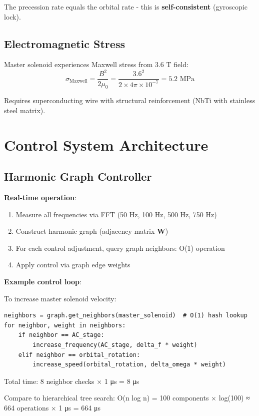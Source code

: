 \documentclass[12pt,a4paper]{article}
\begin{document}
The precession rate equals the orbital rate - this is \textbf{self-consistent} (gyroscopic lock).

\subsection{Electromagnetic Stress}

Master solenoid experiences Maxwell stress from 3.6 T field:
\begin{equation}
\sigma_{\text{Maxwell}} = \frac{B^2}{2\mu_0} = \frac{3.6^2}{2 \times 4\pi \times 10^{-7}} = 5.2 \text{ MPa}
\end{equation}

Requires superconducting wire with structural reinforcement (NbTi with stainless steel matrix).

\section{Control System Architecture}

\subsection{Harmonic Graph Controller}

\textbf{Real-time operation}:
\begin{enumerate}
\item Measure all frequencies via FFT (50 Hz, 100 Hz, 500 Hz, 750 Hz)
\item Construct harmonic graph (adjacency matrix $\mathbf{W}$)
\item For each control adjustment, query graph neighbors: O(1) operation
\item Apply control via graph edge weights
\end{enumerate}

\textbf{Example control loop}:

To increase master solenoid velocity:
\begin{verbatim}
neighbors = graph.get_neighbors(master_solenoid)  # O(1) hash lookup
for neighbor, weight in neighbors:
    if neighbor == AC_stage:
        increase_frequency(AC_stage, delta_f * weight)
    elif neighbor == orbital_rotation:
        increase_speed(orbital_rotation, delta_omega * weight)
\end{verbatim}

Total time: 8 neighbor checks × 1 μs = 8 μs

Compare to hierarchical tree search: O(n log n) = 100 components × log(100) ≈ 664 operations × 1 μs = 664 μs
\end{document}

